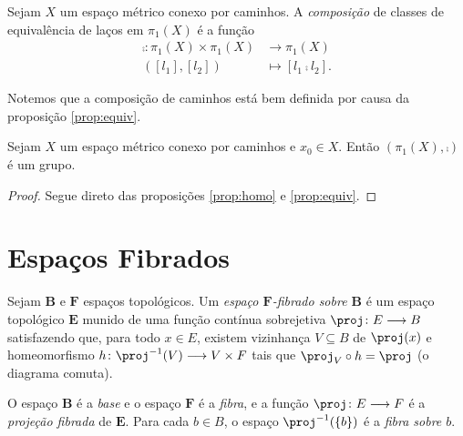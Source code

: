 \begin{defi}
	Sejam $X$ um espaço métrico conexo por caminhos. A \emph{composição} de classes de equivalência de laços em $\pi_1(X)$ é a função
	\begin{align*}
	\comp : \pi_1(X) \times \pi_1(X) &\to \pi_1(X) \\
				([l_1],[l_2]) &\mapsto [l_1 \comp l_2].
	\end{align*}
\end{defi}

Notemos que a composição de caminhos está bem definida por causa da proposição \ref{prop:equiv}.

\begin{teo}
	Sejam $X$ um espaço métrico conexo por caminhos e $x_0 \in X$. Então  $(\pi_1(X),\comp)$ é um grupo.	
\end{teo}
\begin{proof}
	Segue direto das proposições  \ref{prop:homo} e \ref{prop:equiv}.
\end{proof}





\section{Espaços Fibrados}

\begin{defi}
Sejam $\bm B$ e $\bm F$ espaços topológicos. Um \emph{espaço $\bm F$-fibrado sobre $\bm B$} é um espaço topológico $\bm E$ munido de uma função contínua sobrejetiva $\proj\colon E \to B$ satisfazendo que, para todo $x \in E$, existem vizinhança $V \subseteq B$ de $\proj(x)$ e homeomorfismo $h\colon \proj\inv(V) \to V \times F$ tais que $\proj_V \circ h = \proj$ (o diagrama comuta).
\begin{figure}
\centering
{}
\end{figure}
O espaço $\bm B$ é a \emph{base} e o espaço $\bm F$ é a \emph{fibra}, e a função $\proj\colon E \to F$ é a \emph{projeção fibrada} de $\bm E$. Para cada $b \in B$, o espaço $\proj\inv(\{b\})$ é a \emph{fibra sobre $b$}.
\end{defi}

